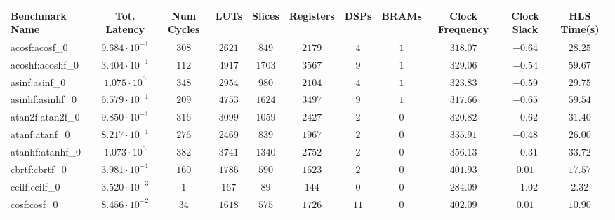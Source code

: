 \begin{tabular}{|l|c|c|c|c|c|c|c|c|c|c|}
\hline
Benchmark Name               & Tot. Latency            & Num Cycles & LUTs      & Slices    & Registers & DSPs    & BRAMs & Clock Frequency & Clock Slack & HLS Time(s) \\
\hline
acosf:acosf\_0               & $ 9.684 \cdot 10^{-1} $ & $ 308    $ & $ 2621  $ & $ 849   $ & $ 2179  $ & $ 4   $ & $ 1 $ & $ 318.07      $ & $ -0.64   $ & $ 28.25   $ \\
acoshf:acoshf\_0             & $ 3.404 \cdot 10^{-1} $ & $ 112    $ & $ 4917  $ & $ 1703  $ & $ 3567  $ & $ 9   $ & $ 1 $ & $ 329.06      $ & $ -0.54   $ & $ 59.67   $ \\
asinf:asinf\_0               & $ 1.075 \cdot 10^{0}  $ & $ 348    $ & $ 2954  $ & $ 980   $ & $ 2104  $ & $ 4   $ & $ 1 $ & $ 323.83      $ & $ -0.59   $ & $ 29.75   $ \\
asinhf:asinhf\_0             & $ 6.579 \cdot 10^{-1} $ & $ 209    $ & $ 4753  $ & $ 1624  $ & $ 3497  $ & $ 9   $ & $ 1 $ & $ 317.66      $ & $ -0.65   $ & $ 59.54   $ \\
atan2f:atan2f\_0             & $ 9.850 \cdot 10^{-1} $ & $ 316    $ & $ 3099  $ & $ 1059  $ & $ 2427  $ & $ 2   $ & $ 0 $ & $ 320.82      $ & $ -0.62   $ & $ 31.40   $ \\
atanf:atanf\_0               & $ 8.217 \cdot 10^{-1} $ & $ 276    $ & $ 2469  $ & $ 839   $ & $ 1967  $ & $ 2   $ & $ 0 $ & $ 335.91      $ & $ -0.48   $ & $ 26.00   $ \\
atanhf:atanhf\_0             & $ 1.073 \cdot 10^{0}  $ & $ 382    $ & $ 3741  $ & $ 1340  $ & $ 2752  $ & $ 2   $ & $ 0 $ & $ 356.13      $ & $ -0.31   $ & $ 33.72   $ \\
cbrtf:cbrtf\_0               & $ 3.981 \cdot 10^{-1} $ & $ 160    $ & $ 1786  $ & $ 590   $ & $ 1623  $ & $ 2   $ & $ 0 $ & $ 401.93      $ & $ 0.01    $ & $ 17.57   $ \\
ceilf:ceilf\_0               & $ 3.520 \cdot 10^{-3} $ & $ 1      $ & $ 167   $ & $ 89    $ & $ 144   $ & $ 0   $ & $ 0 $ & $ 284.09      $ & $ -1.02   $ & $ 2.32    $ \\
cosf:cosf\_0                 & $ 8.456 \cdot 10^{-2} $ & $ 34     $ & $ 1618  $ & $ 575   $ & $ 1726  $ & $ 11  $ & $ 0 $ & $ 402.09      $ & $ 0.01    $ & $ 10.90   $ \\

\end{tabular}
